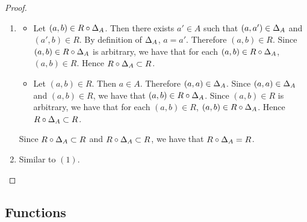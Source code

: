 \documentclass{book}
\begin{document}
	\begin{proof}\
		\begin{enumerate}
			\item 
			\begin{itemize}
				\item Let $(a,b) \in R \circ \Delta_A$. Then there exists $a' \in A$ such that $(a, a') \in \Delta_A$ and $(a',b) \in R$. By definition of $\Delta_A$, $a = a'$. Therefore $(a,b) \in R$. Since $(a,b) \in R \circ \Delta_A$ is arbitrary, we have that for each $(a,b) \in R \circ \Delta_A$, $(a,b) \in R$. Hence $ R \circ \Delta_A \subset R$. 
				\item Let $(a,b) \in R$. Then $a \in A$. Therefore $(a,a) \in \Delta_A$. Since $(a,a) \in \Delta_A$ and $(a,b) \in R$, we have that $(a, b) \in R \circ \Delta_A$. Since $(a,b) \in R$ is arbitrary, we have that for each $(a,b) \in R$, $(a,b) \in R \circ \Delta_A$. Hence $R \circ \Delta_A \subset R$.  
			\end{itemize}
			Since $R \circ \Delta_A \subset R$ and $R \circ \Delta_A \subset R$, we have that $R \circ \Delta_A = R$.
			\item Similar to $(1)$.
		\end{enumerate}
	\end{proof}
	
	
	
	
	
	
	
	
	
	
	
	
	
	
	
	
	
	
	
	
	
	
	
	
	
	
	
	
	
	
	
	
	
	
	
	
	
	
	
	
	
	
	
	\subsection{Functions}
	
	
	
	
	
	
	
	
	
\end{document}
